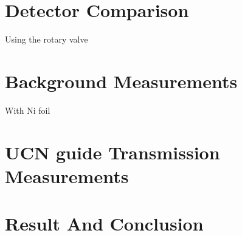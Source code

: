 \section{Detector Comparison\label{sec:detector_comparison}}
Using the rotary valve

\section{Background Measurements}
With Ni foil

\section{UCN guide Transmission Measurements}

\section{Result And Conclusion}

  
  
  
